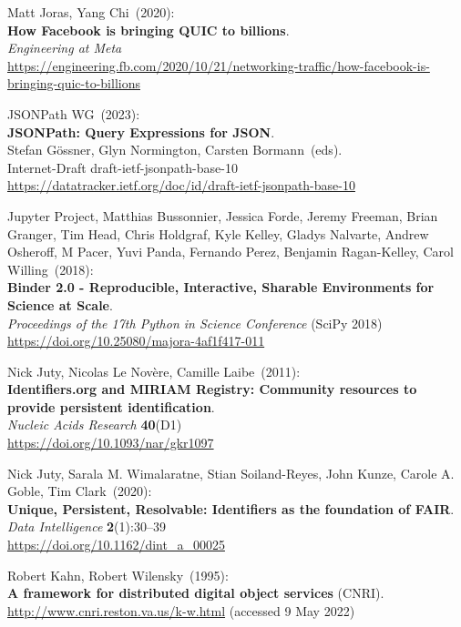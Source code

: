 \begin{thebibliography}{9}
Matt Joras, Yang Chi~(2020): \\
\textbf{How Facebook is bringing QUIC to billions}.\\
\emph{Engineering at Meta}\\
\url{https://engineering.fb.com/2020/10/21/networking-traffic/how-facebook-is-bringing-quic-to-billions}

JSONPath WG~(2023): \\
\textbf{JSONPath: Query Expressions for JSON}.\\
Stefan Gössner, Glyn Normington, Carsten Bormann~(eds).\\
Internet-Draft draft-ietf-jsonpath-base-10\\
\url{https://datatracker.ietf.org/doc/id/draft-ietf-jsonpath-base-10}

Jupyter Project, Matthias Bussonnier, Jessica Forde, Jeremy Freeman, Brian Granger, Tim Head, Chris Holdgraf, Kyle Kelley, Gladys Nalvarte, Andrew Osheroff, M Pacer, Yuvi Panda, Fernando Perez, Benjamin Ragan-Kelley, Carol Willing~(2018): \\
\textbf{Binder 2.0 - Reproducible, Interactive, Sharable Environments for Science at Scale}.\\
\emph{Proceedings of the 17th Python in Science Conference} (SciPy 2018)\\
\url{https://doi.org/10.25080/majora-4af1f417-011}

Nick Juty, Nicolas Le Novère, Camille Laibe~(2011): \\
\textbf{Identifiers.org and {MIRIAM Registry}: Community resources to provide persistent identification}.\\
\emph{Nucleic Acids Research} \textbf{40}(D1) \\
\url{https://doi.org/10.1093/nar/gkr1097}

Nick Juty, Sarala M. Wimalaratne, Stian Soiland-Reyes, John Kunze, Carole A. Goble, Tim Clark~(2020): \\
\textbf{Unique, Persistent, Resolvable: Identifiers as the foundation of FAIR}.
\emph{Data Intelligence} \textbf{2}(1):30–39\\
\url{https://doi.org/10.1162/dint_a_00025}

Robert Kahn, Robert Wilensky~(1995): \\
\textbf{A framework for distributed digital object services} (CNRI).\\
\url{http://www.cnri.reston.va.us/k-w.html} (accessed 9 May 2022)



\end{thebibliography}
